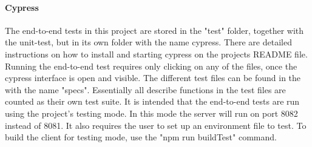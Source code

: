 \paragraph{Cypress}
The end-to-end tests in this project are stored in the "test" folder, together with the unit-test, but in its own folder with the name cypress. There are detailed instructions on how to install and starting cypress on the projects README file. Running the end-to-end test requires only clicking on any of the files, once the cypress interface is open and visible. The different test files can be found in the with the name "specs". Essentially all describe functions in the test files are counted as their own test suite. It is intended that the end-to-end tests are run using the project's testing mode. In this mode the server will run on port 8082 instead of 8081. It also requires the user to set up an environment file to test. To build the client for testing mode, use the "npm run buildTest" command.